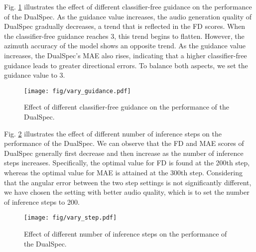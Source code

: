\documentclass{IEEEtran}
\begin{document}
{Fig. \ref{fig:guide} illustrates the effect of different classifier-free guidance on the performance of the DualSpec. As the guidance value increases, the audio generation quality of DualSpec gradually decreases, a trend that is reflected in the FD scores. When the classifier-free guidance reaches 3, this trend begins to flatten. However, the azimuth accuracy of the model shows an opposite trend. As the guidance value increases, the DualSpec's MAE also rises, indicating that a higher classifier-free guidance leads to greater directional errors. To balance both aspects, we set the guidance value to 3.}
\begin{figure}[t]
    \centering
    \texttt{[image: fig/vary\_guidance.pdf]}
    \caption{Effect of different classifier-free guidance on the performance of the DualSpec.}
    \label{fig:guide}
\end{figure}

{Fig. \ref{fig:step} illustrates the effect of different number of inference steps on the performance of the DualSpec. We can observe that the FD and MAE scores of DualSpec generally first decrease and then increase as the number of inference steps increases. Specifically, the optimal value for FD is found at the 200th step, whereas the optimal value for MAE is attained at the 300th step. Considering that the angular error between the two step settings is not significantly different, we have chosen the setting with better audio quality, which is to set the number of inference steps to 200.}
\begin{figure}[t]
    \centering
    \texttt{[image: fig/vary\_step.pdf]}
    \caption{Effect of different number of inference steps on the performance of the DualSpec.}
    \label{fig:step}
\end{figure}
\end{document}
